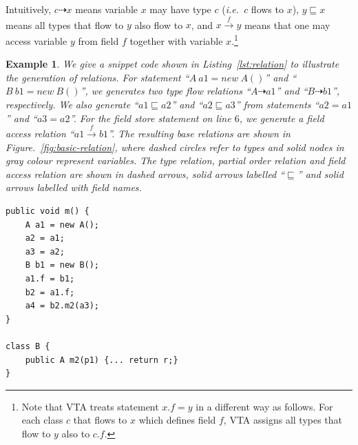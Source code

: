\documentclass{fac}
\newcommand\ie{\textit{i.e.\ }}
\newtheorem{Example}{Example}
\newcommand{\less}{\sqsubseteq}
\newcommand{\tflow}{\dashrightarrow}
\newcommand{\hflow}{\longrightarrow}
\newcommand{\lhflow}[1]{\stackrel{#1}{\hflow}}
\begin{document}
Intuitively, $c\tflow x$ means variable $x$ may have type $c$ (\ie $c$ flows to $x$), $y\less x$ means all types that flow to $y$ also flow to $x$, and $x\lhflow{f}y$ means that one may access variable $y$ from field $f$ together with variable $x$.\footnote{Note that VTA treats statement $x.f = y$ in a different way as follows. For each class $c$ that flows to $x$ which defines field $f$, VTA assigns all types that flow to $y$ also to $c.f$.}

\begin{Example}\label{ex:def1}
We give a snippet code shown in Listing~\ref{lst:relation} to illustrate the generation of relations. For statement ``$A\ a1=new \ A()$'' and ``$B\ b1=new\ B()$'', we generates two type flow relations ``$A \tflow a1$'' and ``$B \tflow b1$'', respectively. We also generate ``$a1 \less a2$'' and ``$a2 \less a3$'' from statements ``$a2=a1$'' and ``$a3=a2$''. For the field store statement on line $6$, we generate a field access relation ``$a1 \lhflow{f} b1$''. The resulting base relations are shown in Figure.~\ref{fig:basic-relation}, where dashed circles refer to types and solid nodes in gray colour represent variables. The type relation, partial order relation and field access relation are shown in dashed arrows, solid arrows labelled ``$\less$'' and solid arrows labelled with field names.
\end{Example}
\begin{minipage}{\linewidth}
\vspace{10pt}
\begin{lstlisting}[caption={An example showing the generation of base relations},label={lst:relation}]
public void m() {
	A a1 = new A();
	a2 = a1;
	a3 = a2;
	B b1 = new B();
	a1.f = b1;
	b2 = a1.f;
	a4 = b2.m2(a3);
}

class B {
	public A m2(p1) {... return r;}
}
\end{lstlisting}
\end{minipage}
\end{document}
